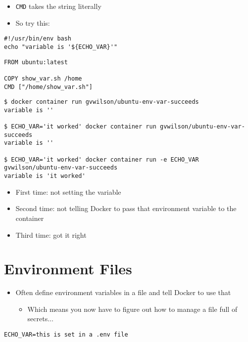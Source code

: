 \documentclass[krantzl]{krantz}
\begin{document}
\begin{itemize}
\item \texttt{CMD} takes the string literally

\item So try this:

\end{itemize}
\begin{lstlisting}[frame=tblr]
#!/usr/bin/env bash
echo "variable is '${ECHO_VAR}'"
\end{lstlisting}

\begin{lstlisting}[frame=tblr]
FROM ubuntu:latest

COPY show_var.sh /home
CMD ["/home/show_var.sh"]
\end{lstlisting}

\begin{lstlisting}[frame=tblr,backgroundcolor=\color{black!5}]
$ docker container run gvwilson/ubuntu-env-var-succeeds
variable is ''

$ ECHO_VAR='it worked' docker container run gvwilson/ubuntu-env-var-succeeds
variable is ''

$ ECHO_VAR='it worked' docker container run -e ECHO_VAR gvwilson/ubuntu-env-var-succeeds
variable is 'it worked'
\end{lstlisting}

\begin{itemize}
\item First time: not setting the variable

\item Second time: not telling Docker to pass that environment variable to the container

\item Third time: got it right

\end{itemize}
\section{Environment Files}
\begin{itemize}
\item Often define environment variables in a file and tell Docker to use that\begin{itemize}
\item Which means you now have to figure out how to manage a file full of secrets...

\end{itemize}


\end{itemize}
\begin{lstlisting}[frame=tblr]
ECHO_VAR=this is set in a .env file
\end{lstlisting}
\end{document}
